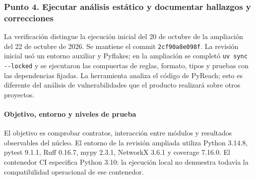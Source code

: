 \subsubsection[Punto 4. Análisis estático, pruebas, hallazgos y correcciones]{Punto 4. Ejecutar análisis estático y documentar hallazgos y correcciones}
La verificación distingue la ejecución inicial del 20 de octubre de la ampliación del 22 de octubre de 2026. Se mantiene el commit \texttt{2cf90a\allowbreak 8e098f}. La revisión inicial usó un entorno auxiliar y Pyflakes; en la ampliación se completó \texttt{uv sync -\allowbreak -\allowbreak locked} y se ejecutaron las compuertas de reglas, formato, tipos y pruebas con las dependencias fijadas. La herramienta analiza el código de PyReach; esto es diferente del análisis de vulnerabilidades que el producto realizará sobre otros proyectos.

\paragraph*{Objetivo, entorno y niveles de prueba}
El objetivo es comprobar contratos, interacción entre módulos y resultados observables del núcleo. El entorno de la revisión ampliada utiliza Python 3.14.8, pytest 9.1.1, Ruff 0.16.7, mypy 2.3.1, NetworkX 3.6.1 y coverage 7.16.0. El contenedor CI especifica Python 3.10: la ejecución local no demuestra todavía la compatibilidad operacional de ese contenedor.

